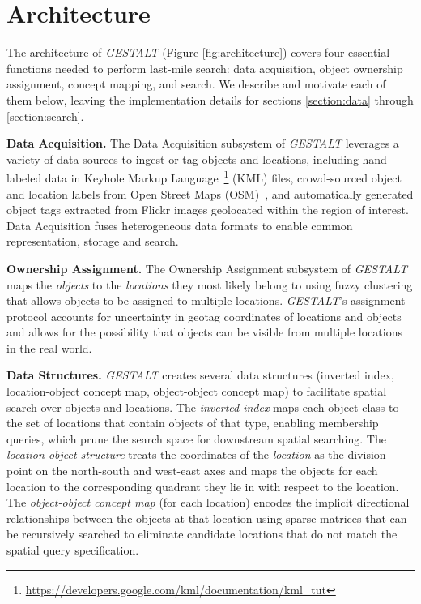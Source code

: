 \section{Architecture}
\label{section:architecture}

\begin{figure*}[t]
    
    \centering
    \caption[width=\textwidth]{\emph{GESTALT} consists of a data collection module, an ownership assignment module, a concept mapping module, and a search module.}
    \label{fig:architecture}
\end{figure*}


The architecture of \textit{GESTALT} (Figure \ref{fig:architecture}) covers four essential functions needed to perform last-mile search: data acquisition, object ownership assignment, concept mapping, and search. 
We describe and motivate each of them below, leaving the implementation details for sections \ref{section:data} through \ref{section:search}. 

\textbf{Data Acquisition.}
The Data Acquisition subsystem of \emph{GESTALT} leverages a variety of data sources to ingest or tag objects and locations, including hand-labeled data in Keyhole Markup Language~\footnote{\href{https://developers.google.com/kml/documentation/kml\_tut}{https://developers.google.com/kml/documentation/kml\_tut}} (KML) files, crowd-sourced object and location labels from Open Street Maps (OSM)~\cite{Haklay2008}, and automatically generated object tags extracted from Flickr images geolocated within the region of interest. 
Data Acquisition fuses heterogeneous data formats to enable common representation, storage and search.

\textbf{Ownership Assignment.}
The Ownership Assignment subsystem of \emph{GESTALT} maps the \textit{objects} to the \textit{locations} they most likely belong to using fuzzy clustering that allows objects to be assigned to multiple locations. 
\emph{GESTALT}'s assignment protocol accounts for uncertainty in geotag coordinates of locations and objects and allows for the possibility that objects can be visible from multiple locations in the real world.

\textbf{Data Structures.}
\emph{GESTALT} creates several data structures (inverted index, location-object concept map, object-object concept map) to facilitate spatial search over objects and locations. 
The \textit{inverted index} maps each object class to the set of locations that contain objects of that type, enabling membership queries, which prune the search space for downstream spatial searching. 
The \textit{location-object structure} treats the coordinates of the \textit{location} as the division point on the north-south and west-east axes and maps the objects for each location to the corresponding quadrant they lie in with respect to the location.
The \textit{object-object concept map} (for each location) encodes the implicit directional relationships between the objects at that location using sparse matrices that can be recursively searched to eliminate candidate locations that do not match the spatial query specification. 

